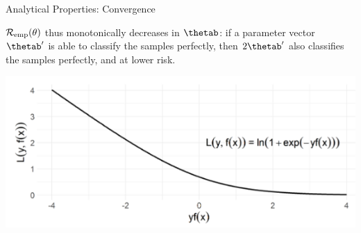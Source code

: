 \begin{vbframe}{Analytical Properties: Convergence}
\begin{minipage}[b]{0.55\textwidth}
  \footnotesize
  $\mathcal{R}_{\text{emp}}(\theta)$ thus monotonically decreases in $\thetab$: if a parameter 
  vector $\thetab^\prime$ is able to classify the samples perfectly, then 
  $2\thetab^\prime$ also classifies the samples perfectly, and at lower risk.
\end{minipage}%
\begin{minipage}[b]{0.05\textwidth}
  \phantom{foo}
\end{minipage}%
\begin{minipage}[b]{0.4\textwidth}
  \includegraphics[width=\textwidth]{figure_man/snap_bernoulli_loss}
\end{minipage}%

\vfill


\end{vbframe}

